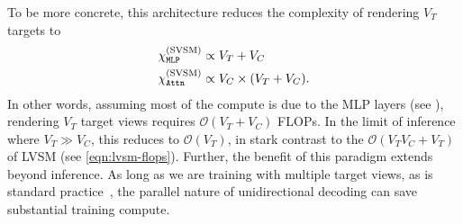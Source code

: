 %
%

To be more concrete, this architecture reduces the complexity of rendering $V_T$ targets to
\begin{equation}\label{eqn:svsm-flops}
\begin{split}
    \chi_{\mathtt{MLP}}^{\text{(SVSM)}} & \propto V_T + V_C
    \\
    \chi_{\mathtt{Attn}}^{\text{(SVSM)}} & \propto V_C\times (V_T + V_C).
\end{split}
\end{equation}
%
In other words, assuming most of the compute is due to the MLP layers (see ), rendering $V_T$ target views requires $\mathcal O(V_T + V_C)$ FLOPs. In the limit of inference where $V_T \gg V_C$, this reduces to $\mathcal O(V_T)$, in stark contrast to the $\mathcal O(V_TV_C + V_T)$ of LVSM (see \eqref{eqn:lvsm-flops}). Further, the benefit of this paradigm extends beyond inference. As long as we are training with multiple target views, as is standard practice~\citep{charatan2024pixelsplat, jin2024lvsm, sajjadi2022scene, zhang2024gs}, the parallel nature of unidirectional decoding can save substantial training compute.


